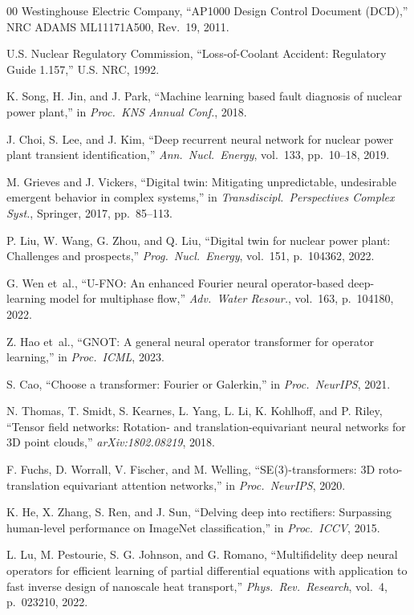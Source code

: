 \documentclass[conference]{IEEEtran}
\begin{document}
\begin{thebibliography}{00}
Westinghouse Electric Company,
``AP1000 Design Control Document (DCD),''
NRC ADAMS ML11171A500, Rev.~19, 2011.

U.S. Nuclear Regulatory Commission,
``Loss-of-Coolant Accident: Regulatory Guide 1.157,''
U.S. NRC, 1992.

K. Song, H. Jin, and J. Park,
``Machine learning based fault diagnosis of nuclear power plant,''
in \textit{Proc.\ KNS Annual Conf.}, 2018.

J. Choi, S. Lee, and J. Kim,
``Deep recurrent neural network for nuclear power plant transient identification,''
\textit{Ann.\ Nucl.\ Energy}, vol.~133, pp.~10--18, 2019.

M. Grieves and J. Vickers,
``Digital twin: Mitigating unpredictable, undesirable emergent behavior in complex systems,''
in \textit{Transdiscipl.\ Perspectives Complex Syst.}, Springer, 2017, pp.~85--113.

P. Liu, W. Wang, G. Zhou, and Q. Liu,
``Digital twin for nuclear power plant: Challenges and prospects,''
\textit{Prog.\ Nucl.\ Energy}, vol.~151, p.~104362, 2022.

G. Wen et~al.,
``U-FNO: An enhanced Fourier neural operator-based deep-learning model for multiphase flow,''
\textit{Adv.\ Water Resour.}, vol.~163, p.~104180, 2022.

Z. Hao et~al.,
``GNOT: A general neural operator transformer for operator learning,''
in \textit{Proc.\ ICML}, 2023.

S. Cao,
``Choose a transformer: Fourier or Galerkin,''
in \textit{Proc.\ NeurIPS}, 2021.

N. Thomas, T. Smidt, S. Kearnes, L. Yang, L. Li, K. Kohlhoff, and P. Riley,
``Tensor field networks: Rotation- and translation-equivariant neural networks for 3D point clouds,''
\textit{arXiv:1802.08219}, 2018.

F. Fuchs, D. Worrall, V. Fischer, and M. Welling,
``SE(3)-transformers: 3D roto-translation equivariant attention networks,''
in \textit{Proc.\ NeurIPS}, 2020.

K. He, X. Zhang, S. Ren, and J. Sun,
``Delving deep into rectifiers: Surpassing human-level performance on ImageNet classification,''
in \textit{Proc.\ ICCV}, 2015.

L. Lu, M. Pestourie, S. G. Johnson, and G. Romano,
``Multifidelity deep neural operators for efficient learning of partial differential equations with application to fast inverse design of nanoscale heat transport,''
\textit{Phys.\ Rev.\ Research}, vol.~4, p.~023210, 2022.


\end{thebibliography}
\end{document}
